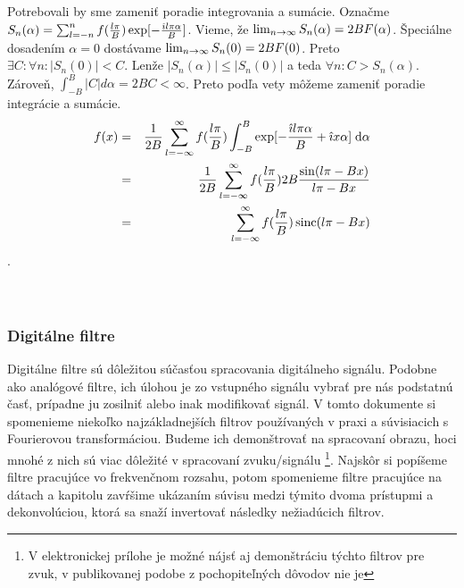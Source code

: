 \begin{dokaz}
    Potrebovali by sme zameniť poradie integrovania a sumácie.
    Označme $S_n(\alpha) = \sum_{l=-n}^{n} f(\frac{l \pi}{B})
    \exp[-\frac{\hat{\imath} l \pi \alpha}{B}]$.
    Vieme, že $\lim_{n\rightarrow \infty} S_n(\alpha) = 2 B F(\alpha)$.
    Špeciálne dosadením $\alpha=0$ dostávame
     $\lim_{n \rightarrow \infty} S_n(0) = 2 B F(0)$.
     Preto $\exists C: \forall n: |S_n(0)| < C$.
     Lenže $|S_n(\alpha)| \le |S_n(0)|$ a teda $\forall n: C >
     S_n(\alpha)$.
     Zároveň, $\int_{-B}^B |C| d\alpha = 2 B C < \infty$.
     Preto podľa vety 
     môžeme zameniť poradie integrácie a sumácie.     
    \begin{eqnarray}
       f(x) & = & \frac{1}{2B}  \sum_{l=-\infty}^{\infty} 
                f(\frac{l \pi}{B}) \int_{-B}^{B} 
                \exp[-\frac{\hat{\imath} l \pi \alpha}{B}
                + \hat{\imath} x \alpha] \; \mathrm{d}\alpha \\
            & = & \frac{1}{2B} \sum_{l=-\infty}^{\infty}
                f(\frac{l \pi}{B}) 2B \frac{\sin(l \pi - B x)}{l \pi -
                B x} \\
            & = & \sum_{l=-\infty}^{\infty}
                f(\frac{l \pi}{B})  \operatorname{sinc}(l \pi - B x)
    \end{eqnarray}
    . \\
    \todo{} \\
    \todo{} \\
    \todo{}
\end{dokaz}



\subsubsection{Digitálne filtre}
Digitálne filtre sú dôležitou súčasťou spracovania digitálneho
signálu. Podobne ako analógové filtre, ich úlohou je zo vstupného
signálu vybrať pre nás podstatnú časť, prípadne ju zosilniť alebo inak
modifikovať signál. V tomto dokumente si spomenieme niekoľko 
najzákladnejších filtrov používaných v praxi a súvisiacich s Fourierovou
transformáciou. Budeme ich demonštrovať na spracovaní obrazu, hoci
mnohé z nich sú viac dôležité v spracovaní zvuku/signálu 
\footnote{V elektronickej prílohe je možné nájsť aj demonštráciu 
týchto filtrov pre zvuk, v publikovanej podobe z pochopiteľných
dôvodov nie je
}.
Najskôr si popíšeme filtre pracujúce vo frekvenčnom rozsahu, potom
spomenieme filtre pracujúce na  dátach a kapitolu
zavŕšime ukázaním súvisu medzi týmito dvoma prístupmi a
dekonvolúciou, ktorá sa snaží invertovať následky nežiadúcich filtrov.

